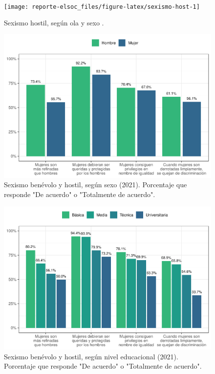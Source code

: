 \documentclass[
  12pt,
  openany]{book}
\begin{document}
\begin{figure}

{\centering \texttt{[image: reporte-elsoc\_files/figure-latex/sexismo-host-1]} 

}

\caption{Sexismo hostil, según ola y sexo .}\label{fig:sexismo-host}
\end{figure}

\begin{figure}

{\centering \includegraphics{reporte-elsoc_files/figure-latex/sexismo-sexo-1} 

}

\caption{Sexismo benévolo y hostil, según sexo (2021). Porcentaje que responde "De acuerdo" o "Totalmente de acuerdo".}\label{fig:sexismo-sexo}
\end{figure}

\begin{figure}

{\centering \includegraphics{reporte-elsoc_files/figure-latex/sexismo-educ-1} 

}

\caption{Sexismo benévolo y hostil, según nivel educacional (2021). Porcentaje que responde "De acuerdo" o "Totalmente de acuerdo".}\label{fig:sexismo-educ}
\end{figure}
\end{document}
